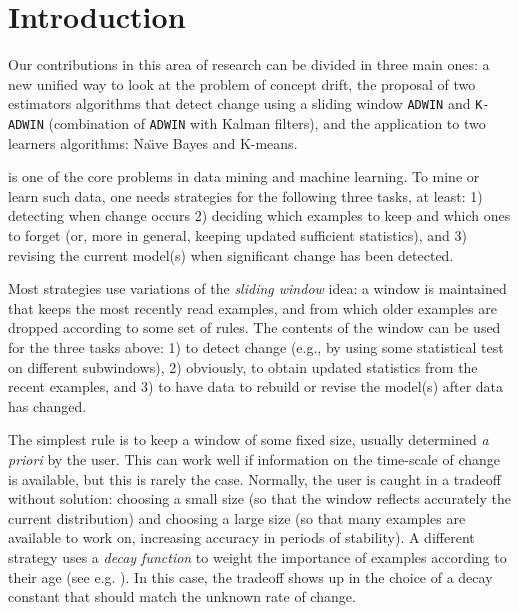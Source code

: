 \section{Introduction}
\label{Introduction}

 Our contributions in this area of research %
 can be divided in three main ones: a new unified way to look at the problem of concept drift, the proposal of 
two estimators algorithms that detect change using a sliding 
window {\tt ADWIN} and {\tt K-ADWIN} (combination of {\tt ADWIN} with Kalman filters),
and the application to two learners algorithms: Na\"{\i}ve Bayes and K-means.



\BEGINOMIT
is one of the core problems in data mining and machine learning.
To mine or learn such data, one needs strategies for
the following three tasks, at least: 1) detecting when
change occurs 2) deciding which examples to keep and which ones
to forget (or, more in general, keeping updated sufficient statistics),
and 3) revising the current model(s) when significant  
change has been detected.

Most strategies use variations of the {\em sliding window} idea:
a window is maintained that keeps the most recently read examples,
and from which older examples are dropped according to some
set of rules. The contents of the window can be used for the
three tasks above: 1) to detect change (e.g., by using some statistical
test on different subwindows), 2) obviously, to
obtain updated statistics from the recent examples,
and 3) to have data to rebuild or revise the model(s) after data has 
changed.

The simplest rule is to keep a window
of some fixed size, usually determined {\em a priori} by the user.
This can work well if information on the time-scale
of change is available, but this is rarely the case.
Normally, the user is caught in a tradeoff without solution:
choosing a small size (so that the window reflects accurately the current distribution)
and choosing a large size (so that many examples are available to work on, 
increasing accuracy in periods of stability).
A different strategy uses a {\em decay function}
to weight the importance of examples according to their
age (see e.g. \cite{CS03}). %
In this case, the tradeoff shows up in the 
choice of a decay constant that should match the unknown rate of change.

